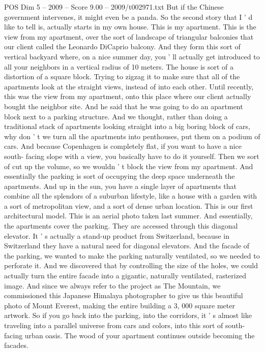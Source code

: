\begin{textsample}{POS Dim 5 – 2009 – Score 9.00 – 2009/t002971.txt}
But if the Chinese government intervenes, it might even be a panda.
So the second story that I ' d like to tell is, actually starts in my own house.
This is my apartment.
This is the view from my apartment, over the sort of landscape of triangular balconies that our client called the Leonardo DiCaprio balcony.
And they form this sort of vertical backyard where, on a nice summer day, you ' ll actually get introduced to all your neighbors in a vertical radius of 10 meters.
The house is sort of a distortion of a square block.
Trying to zigzag it to make sure that all of the apartments look at the straight views, instead of into each other.
Until recently, this was the view from my apartment, onto this place where our client actually bought the neighbor site.
And he said that he was going to do an apartment block next to a parking structure.
And we thought, rather than doing a traditional stack of apartments looking straight into a big boring block of cars, why don ' t we turn all the apartments into penthouses, put them on a podium of cars.
And because Copenhagen is completely flat, if you want to have a nice south- facing slope with a view, you basically have to do it yourself.
Then we sort of cut up the volume, so we wouldn ' t block the view from my apartment.
And essentially the parking is sort of occupying the deep space underneath the apartments.
And up in the sun, you have a single layer of apartments that combine all the splendors of a suburban lifestyle, like a house with a garden with a sort of metropolitan view, and a sort of dense urban location.
This is our first architectural model.
This is an aerial photo taken last summer.
And essentially, the apartments cover the parking.
They are accessed through this diagonal elevator.
It ' s actually a stand-up product from Switzerland, because in Switzerland they have a natural need for diagonal elevators.
And the facade of the parking, we wanted to make the parking naturally ventilated, so we needed to perforate it.
And we discovered that by controlling the size of the holes, we could actually turn the entire facade into a gigantic, naturally ventilated, rasterized image.
And since we always refer to the project as The Mountain, we commissioned this Japanese Himalaya photographer to give us this beautiful photo of Mount Everest, making the entire building a 3, 000 square meter artwork.
So if you go back into the parking, into the corridors, it ' s almost like traveling into a parallel universe from cars and colors, into this sort of south-facing urban oasis.
The wood of your apartment continues outside becoming the facades.

\end{textsample}
